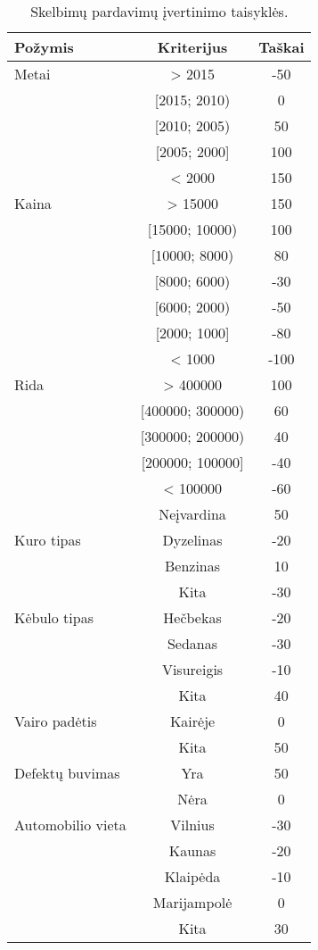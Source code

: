\documentclass{VUMIFPSkursinis}
\begin{document}
\begin{table}[H]\footnotesize
  \centering
  \caption{Skelbimų pardavimų įvertinimo taisyklės.}
  {\begin{tabular}{|l|c|c|} \hline
    Požymis & Kriterijus & Taškai \\
    \hline
    Metai & > 2015         & -50       \\
         & [2015; 2010)   & 0      \\
         & [2010; 2005)   & 50      \\
         & [2005; 2000]   & 100      \\
         & < 2000   & 150      \\
    \hline
    Kaina & > 15000         & 150\\
        & [15000; 10000)   & 100      \\
        & [10000; 8000)   & 80      \\
        & [8000; 6000)   & -30      \\
        & [6000; 2000)   & -50     \\
        & [2000; 1000]   & -80     \\
        & < 1000   & -100     \\
    \hline
    Rida & > 400000         & 100\\
        & [400000; 300000)   & 60      \\
        & [300000; 200000)   & 40      \\
        & [200000; 100000]   & -40      \\
        & < 100000   & -60     \\
        & Neįvardina   & 50     \\
    \hline
    Kuro tipas & Dyzelinas   & -20\\
        & Benzinas   & 10      \\
        & Kita   & -30      \\
    \hline
    Kėbulo tipas & Hečbekas   & -20\\
        & Sedanas   & -30      \\
        & Visureigis   & -10      \\
        & Kita   & 40     \\
    \hline
    Vairo padėtis & Kairėje   & 0\\
        & Kita   & 50      \\
    \hline
    Defektų buvimas & Yra   & 50\\
        & Nėra   & 0      \\
    \hline
    Automobilio vieta & Vilnius   & -30\\
        & Kaunas   & -20      \\
        & Klaipėda   & -10      \\
        & Marijampolė   & 0      \\
        & Kita   & 30      \\
    \hline
  \end{tabular}}
  \label{tab:table example}
\end{table}
\end{document}
